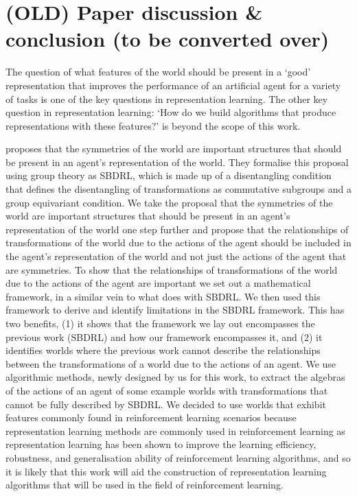 \chapter{(OLD) Paper discussion \& conclusion (to be converted over)}

The question of what features of the world should be present in a `good' representation that improves the performance of an artificial agent for a variety of tasks is one of the key questions in representation learning.
The other key question in representation learning: `How do we build algorithms that produce representations with these features?' is beyond the scope of this work.

\autocite{Higgins2018} proposes that the symmetries of the world are important structures that should be present in an agent's representation of the world.
They formalise this proposal using group theory as SBDRL, which is made up of a disentangling condition that defines the disentangling of transformations as commutative subgroups and a group equivariant condition.
We take the proposal that the symmetries of the world are important structures that should be present in an agent's representation of the world one step further and propose that the relationships of transformations of the world due to the actions of the agent should be included in the agent's representation of the world and not just the actions of the agent that are symmetries.
To show that the relationships of transformations of the world due to the actions of the agent are important we set out a mathematical framework, in a similar vein to what \autocite{Higgins2018} does with SBDRL.
We then used this framework to derive and identify limitations in the SBDRL framework.
This has two benefits, (1) it shows that the framework we lay out encompasses the previous work (SBDRL) and how our framework encompasses it, and (2) it identifies worlds where the previous work cannot describe the relationships between the transformations of a world due to the actions of an agent.
We use algorithmic methods, newly designed by us for this work, to extract the algebras of the actions of an agent of some example worlds with transformations that cannot be fully described by SBDRL.
We decided to use worlds that exhibit features commonly found in reinforcement learning scenarios because representation learning methods are commonly used in reinforcement learning as representation learning has been shown to improve the learning efficiency, robustness, and generalisation ability of reinforcement learning algorithms, and so it is likely that this work will aid the construction of representation learning algorithms that will be used in the field of reinforcement learning.

